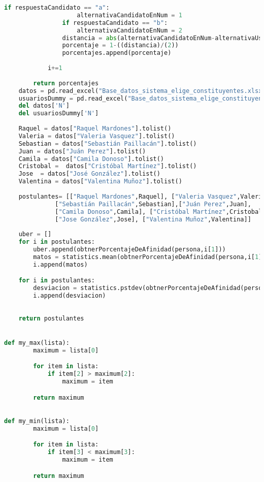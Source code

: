 \documentclass[a4paper]{article}
\begin{document}
\begin{lstlisting}[language=Python]
                if respuestaCandidato == "a":
                    alternativaCandidatoEnNum = 1
                if respuestaCandidato == "b":
                    alternativaCandidatoEnNum = 2
                distancia = abs(alternativaCandidatoEnNum-alternativaUsuarioEnNum)
                porcentaje = 1-((distancia)/(2))
                porcentajes.append(porcentaje)   
            
            i+=1
        
        return porcentajes
    datos = pd.read_excel("Base_datos_sistema_elige_constituyentes.xlsx")
    usuariosDummy = pd.read_excel("Base_datos_sistema_elige_constituyentes.xlsx", sheet_name = "Respuestas usuariosas")
    del datos['N']
    del usuariosDummy['N']
    
    Raquel = datos["Raquel Mardones"].tolist()
    Valeria = datos["Valeria Vasquez"].tolist()
    Sebastian = datos["Sebastián Paillacán"].tolist()
    Juan = datos["Juán Perez"].tolist()
    Camila = datos["Camila Donoso"].tolist()
    Cristobal =  datos["Cristóbal Martínez"].tolist()
    Jose  = datos["José González"].tolist()
    Valentina = datos["Valentina Muñoz"].tolist()
    
    postulantes= [["Raquel Mardones",Raquel], ["Valeria Vasquez",Valeria], 
              ["Sebastián Paillacán",Sebastian],["Juán Perez",Juan],
              ["Camila Donoso",Camila], ["Cristóbal Martínez",Cristobal], 
              ["Jose González",Jose], ["Valentina Muñoz",Valentina]]
    
    uber = []
    for i in postulantes:
        uber.append(obtnerPorcentajeDeAfinidad(persona,i[1]))
        matos = statistics.mean(obtnerPorcentajeDeAfinidad(persona,i[1]))
        i.append(matos)

    for i in postulantes:
        desviacion = statistics.pstdev(obtnerPorcentajeDeAfinidad(persona,i[1]))
        i.append(desviacion)
   
    
    return postulantes


def my_max(lista):
        maximum = lista[0]

        for item in lista:
            if item[2] > maximum[2]:
                maximum = item

        return maximum    

   
def my_min(lista):
        maximum = lista[0]

        for item in lista:
            if item[3] < maximum[3]:
                maximum = item

        return maximum 



\end{lstlisting}
\end{document}
